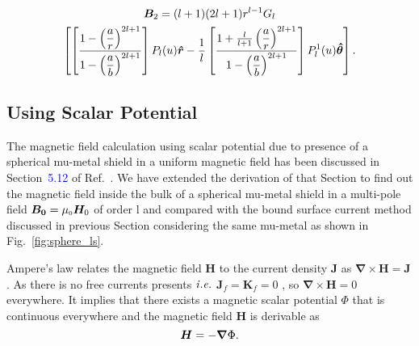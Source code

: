 \begin{multline}\label{B2}
    \bm B_2= (l+1)(2l+1)r^{l-1}G_l\\\left[\left[\frac{1-\left(\dfrac{a}{r}\right)^{2l+1}}{1-\left(\dfrac{a}{b}\right)^{2l+1}}\right] P_l(u) \bm{\hat{r}} -\frac{1}{l}\left[\frac{1+\frac{l}{l+1}\left(\dfrac{a}{r}\right)^{2l+1}}{1-\left(\dfrac{a}{b}\right)^{2l+1}}\right] P_l^1(u) \bm{\hat{\theta}}\right]{\rm .}
\end{multline}



\subsection{Using Scalar Potential}
The magnetic field calculation using scalar potential due to presence of a spherical mu-metal shield in a uniform magnetic field has been discussed in Section~\textcolor{blue}{5.12} of Ref.~\cite{jackson}. We have extended the derivation of that Section to find out the magnetic field inside the bulk of a spherical mu-metal shield in a multi-pole field \(\bm{B_0}= \mu_{\scriptscriptstyle 0} \bm H_0\) of order l and compared with the bound surface current method discussed in previous Section considering the same mu-metal as shown in Fig.~\ref{fig:sphere_ls}.


Ampere's law relates the magnetic field $\bm{H}$ to the current density $\bm{J}$ as \(\bm{\nabla}\times\bm{H}=\bm{J}\). As there is no free currents presents $\it{i.e.}$ \(\bm{J}_f=\bm{K}_f=0\) , so \(\bm{\nabla}\times\bm{H}=0\) everywhere. It implies that there exists a magnetic scalar potential \(\Phi\) that is continuous  everywhere and the  magnetic field $\bm{H}$ is derivable as
\begin{equation}\label{H}
\bm{H}=-\bm{\nabla}\Phi{\rm .}
\end{equation} 


